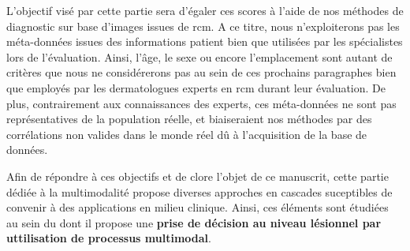 L'objectif visé par cette partie sera d'égaler ces scores à l'aide de nos méthodes de diagnostic sur base d'images issues de \gls{rcm}. A ce titre, nous n'exploiterons pas les méta-données issues des informations patient bien que utilisées par les spécialistes lors de l'évaluation. Ainsi, l'âge, le sexe ou encore l'emplacement sont autant de critères que nous ne considérerons pas au sein de ces prochains paragraphes bien que employés par les dermatologues experts en \gls{rcm} durant leur évaluation. De plus, contrairement aux connaissances des experts, ces méta-données ne sont pas représentatives de la population réelle, et biaiseraient nos méthodes par des corrélations non valides dans le monde réel dû à l'acquisition de la base de données.\par


Afin de répondre à ces objectifs et de clore l'objet de ce manuscrit, cette partie dédiée à la multimodalité propose diverses approches en cascades suceptibles de convenir à des applications en milieu clinique. Ainsi, ces éléments sont étudiées au sein du  dont il propose une \textbf{prise de décision au niveau lésionnel par uttilisation de processus multimodal}.\par